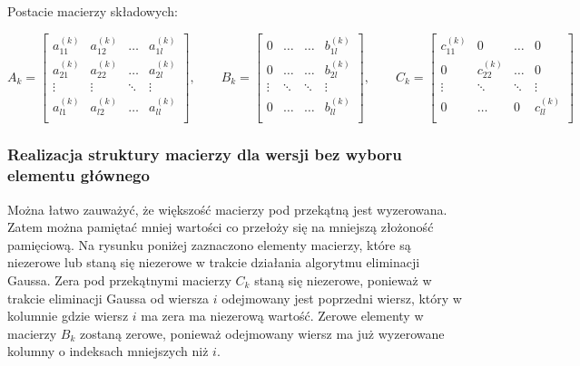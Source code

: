 \documentclass{article}
\begin{document}
Postacie macierzy składowych:
\begin{center}
    $$
    A_k = 
    \begin{bmatrix}
        a^{(k)}_{11} & a^{(k)}_{12} & \dots & a^{(k)}_{1l} \\
        a^{(k)}_{21} & a^{(k)}_{22} & \dots & a^{(k)}_{2l} \\
        \vdots & \vdots & \ddots & \vdots \\
        a^{(k)}_{l1} & a^{(k)}_{l2} & \dots & a^{(k)}_{ll} \\
    \end{bmatrix},
    \qquad
    B_k = 
    \begin{bmatrix}
        0 & \dots & \dots & b^{(k)}_{1l} \\
        0 & \dots & \dots & b^{(k)}_{2l} \\
        \vdots & \ddots & \ddots & \vdots \\
        0 & \dots & \dots & b^{(k)}_{ll} \\
    \end{bmatrix},
    \qquad
    C_k = 
    \begin{bmatrix}
        c^{(k)}_{11} & 0 & \dots & 0 \\
        0 & c^{(k)}_{22} & \dots & 0\\
        \vdots & \ddots & \ddots & \vdots \\
        0 & \dots & 0 & c^{(k)}_{ll} \\
    \end{bmatrix}
    $$
\end{center}

\subsubsection{Realizacja struktury macierzy dla wersji bez wyboru elementu głównego}
Można łatwo zauważyć, że większość macierzy pod przekątną jest wyzerowana. Zatem można pamiętać mniej wartości co przełoży się na mniejszą złożoność pamięciową.
Na rysunku poniżej zaznaczono elementy macierzy, które są niezerowe lub staną się niezerowe w trakcie działania algorytmu eliminacji Gaussa.
Zera pod przekątnymi macierzy $C_k$ staną się niezerowe, ponieważ w trakcie eliminacji Gaussa od wiersza $i$ odejmowany jest poprzedni wiersz, który w kolumnie gdzie wiersz $i$ ma zera ma niezerową wartość.
Zerowe elementy w macierzy $B_k$ zostaną zerowe, ponieważ odejmowany wiersz ma już wyzerowane kolumny o indeksach mniejszych niż $i$.
\end{document}
